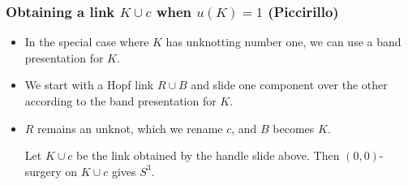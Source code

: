 \documentclass{beamer}
\theoremstyle{ex}
\theoremstyle{rem}
\begin{document}
	\begin{frame}
		\frametitle{Obtaining a link $K\cup c$ when $u(K)=1$ (Piccirillo)}
		\begin{itemize}
			\item In the special case where $K$ has unknotting number one, we can use a band presentation for $K$.
			
			\item We start with a Hopf link $R\cup B$ and slide one component over the other according to the band presentation for $K$.
			
			\item $R$ remains an unknot, which we rename $c$, and $B$ becomes $K$.
			
			\begin{lemma}
				Let $K\cup c$ be the link obtained by the handle slide above. Then $(0,0)$-surgery on $K\cup c$ gives $S^3$.
			\end{lemma}
			

\end{itemize}
\end{frame}
\end{document}
